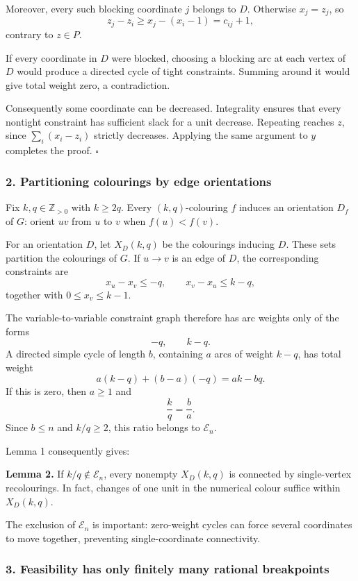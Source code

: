\documentclass[
  11pt,
  a4paper,
]{article}
\newcounter{none} %
\begin{document}
Moreover, every such blocking coordinate \(j\) belongs to \(D\).
Otherwise \(x_j=z_j\), so \[
z_j-z_i\ge x_j-(x_i-1)=c_{ij}+1,
\] contrary to \(z\in P\).

If every coordinate in \(D\) were blocked, choosing a blocking arc at
each vertex of \(D\) would produce a directed cycle of tight
constraints. Summing around it would give total weight zero, a
contradiction.

Consequently some coordinate can be decreased. Integrality ensures that
every nontight constraint has sufficient slack for a unit decrease.
Repeating reaches \(z\), since \(\sum_i(x_i-z_i)\) strictly decreases.
Applying the same argument to \(y\) completes the proof. \(\square\)

\subsubsection{2. Partitioning colourings by edge
orientations}\label{partitioning-colourings-by-edge-orientations}

Fix \(k,q\in\mathbb Z_{>0}\) with \(k\ge2q\). Every \((k,q)\)-colouring
\(f\) induces an orientation \(D_f\) of \(G\): orient \(uv\) from \(u\)
to \(v\) when \(f(u)<f(v)\).

For an orientation \(D\), let \(X_D(k,q)\) be the colourings inducing
\(D\). These sets partition the colourings of \(G\). If \(u\to v\) is an
edge of \(D\), the corresponding constraints are \[
x_u-x_v\le -q,
\qquad
x_v-x_u\le k-q,
\] together with \(0\le x_v\le k-1\).

The variable-to-variable constraint graph therefore has arc weights only
of the forms \[
-q,\qquad k-q.
\] A directed simple cycle of length \(b\), containing \(a\) arcs of
weight \(k-q\), has total weight \[
a(k-q)+(b-a)(-q)=ak-bq.
\] If this is zero, then \(a\ge1\) and \[
\frac{k}{q}=\frac ba.
\] Since \(b\le n\) and \(k/q\ge2\), this ratio belongs to
\(\mathcal E_n\).

Lemma 1 consequently gives:

\textbf{Lemma 2.} If \(k/q\notin\mathcal E_n\), every nonempty
\(X_D(k,q)\) is connected by single-vertex recolourings. In fact,
changes of one unit in the numerical colour suffice within \(X_D(k,q)\).

The exclusion of \(\mathcal E_n\) is important: zero-weight cycles can
force several coordinates to move together, preventing single-coordinate
connectivity.

\subsubsection{3. Feasibility has only finitely many rational
breakpoints}\label{feasibility-has-only-finitely-many-rational-breakpoints}
\end{document}
